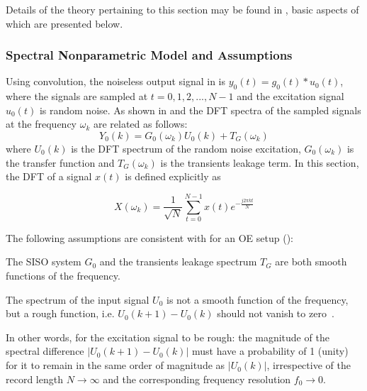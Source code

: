 Details of the theory pertaining to this section may be found in \citet{Schoukens2009LPM}, basic aspects of which are presented below.


\subsubsection{Spectral Nonparametric Model and Assumptions}

Using convolution, the noiseless output signal in  is $y_0(t) = g_0(t)*u_0(t)$, where the signals are sampled at $t = 0, 1, 2,...,N-1$ and the excitation signal $u_0(t)$ is random noise. 
As shown in \citet{Pintelon2012} and \citet{Pintelon1997ARB} the \gls{DFT} spectra of the sampled signals at the frequency $\omega_k$ are related as follows:
\begin{equation}\label{eq:nparam:trunc:LPM:leakage}
Y_0(k)=G_0(\omega_k)U_0(k)+T_G(\omega_k)
\end{equation}
where $U_0(k)$ is the \gls{DFT} spectrum of the random noise excitation,  $G_0(\omega_k)$ is the transfer function and $T_G(\omega_k)$ is the transients leakage term.
In this section, the \gls{DFT} of a signal $x(t)$ is defined explicitly as~\citep{Oppenheim1983}

\begin{equation}\label{eq:defDFT}
X(\omega_k) = \frac{1}{\sqrt{N}}\sum_{t=0}^{N-1}x(t)e^{-\frac{j2\pi kt}{N}}
\end{equation}


The following assumptions are consistent with \citep{Schoukens2009LPM} for an \gls{OE} setup ():
\begin{assumption}
The \gls{SISO} system $G_0$ and  the transients leakage spectrum $T_G$ are both smooth functions of the frequency.
\end{assumption}

\begin{assumption}
The spectrum of the  input signal $U_0$ is not a smooth function of the frequency, but a rough function, i.e. $U_0(k+1) - U_0(k)$ should not vanish to zero~\citep{Schoukens2009LPM}.
\end{assumption}

In other words, for the excitation signal to be rough: the magnitude of the spectral difference $|U_0(k+1) - U_0(k)|$ must have a probability of 1 (unity) for it to remain in the same order of magnitude as $|U_0(k)|$, irrespective of the record length $N\rightarrow\infty$ and the corresponding  frequency resolution $f_0\rightarrow{0}$.


